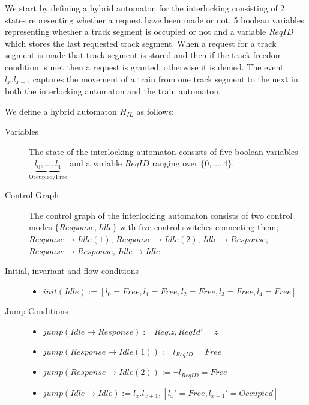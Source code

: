 We start by defining a hybrid automaton for the interlocking consisting of 2 states representing whether a request have been made or not, 5 boolean variables representing whether a track segment is occupied or not and a variable $ReqID$ which stores the last requested track segment. When a request for a track segment is made that track segment is stored and then if the track freedom condition is met then a request is granted, otherwise it is denied. The event $l_x.l_{x+1}$ captures the movement of a train from one track segment to the next in both the interlocking automaton and the train automaton.
\medskip
\begin{mydef}
We define a hybrid automaton $H_{IL}$ as follows:
\begin{description}
\item[Variables] The state of the interlocking automaton consists of five boolean variables  $\underbrace{l_0, \ldots , l_4}_\text{Occupied/Free}$ and a variable $ReqID$ ranging over $\{0 , \ldots , 4 \}$.

\item[Control Graph] The control graph of the interlocking automaton consists of two control modes $\{Response, Idle \}$ with five control switches connecting them; $Response \to Idle (1)$, $Response \to Idle (2)$, $Idle \to Response$, $Response \to Response$, $Idle \to Idle$.

\item[Initial, invariant and flow conditions] \hspace*{0mm}
	\begin{itemize}
	\item $init(Idle) := [l_0 = Free, l_1 = Free, l_2 = Free, l_3 = Free, l_4 = Free]$.

	\end{itemize}

\item[Jump Conditions] \hspace*{0mm}

	\begin{itemize}
	\item $jump(Idle \to Response) :=  Req.z , ReqId' = z$

	
	\item $jump(Response \to Idle (1)) :=  l_{ReqID} = Free $ 
    

         \item $jump(Response \to Idle (2)) :=  \neg l_{ReqID} = Free$


	\item $jump(Idle \to Idle) := l_x. l_{x+1} , [l_x' = Free, l_{x+1}' = Occupied]$


\end{itemize}
\end{description}
\end{mydef}
